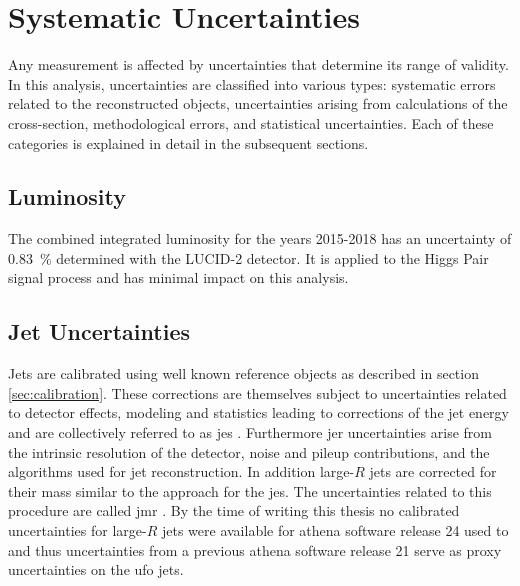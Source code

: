 \chapter{Systematic Uncertainties}\label{ch:systematics}
Any measurement is affected by uncertainties that determine its range of validity. In this analysis, uncertainties are classified into various types: systematic errors related to the reconstructed objects, uncertainties arising from calculations of the cross-section, methodological errors, and statistical uncertainties. Each of these categories is explained in detail in the subsequent sections.

\section{Luminosity}
The combined integrated luminosity for the years 2015-2018 has an uncertainty of \qty[]{0.83}{\percent} determined with the LUCID-2 detector. It is applied to the Higgs Pair signal process and has minimal impact on this analysis.

\section{Jet Uncertainties}
Jets are calibrated using well known reference objects as described in section \ref{sec:calibration}. These corrections are themselves subject to uncertainties related to detector effects, modeling and statistics leading to corrections of the jet energy and are collectively referred to as \ac{jes} \citep{atlas2021jet,Aaboud:2019aa}. %
Furthermore \ac{jer} uncertainties arise from the intrinsic resolution of the detector, noise and pileup contributions, and the algorithms used for jet reconstruction. In addition large-$R$ jets are corrected for their mass similar to the approach for the \ac{jes}. The uncertainties related to this procedure are called \ac{jmr} \citep{ATLAS-CONF-2020-022}. By the time of writing this thesis no calibrated uncertainties for large-$R$ jets were available for athena software release 24 used to  and thus uncertainties from a previous athena software release 21 \citep{Athena} serve as proxy uncertainties on the \ac{ufo} jets.

